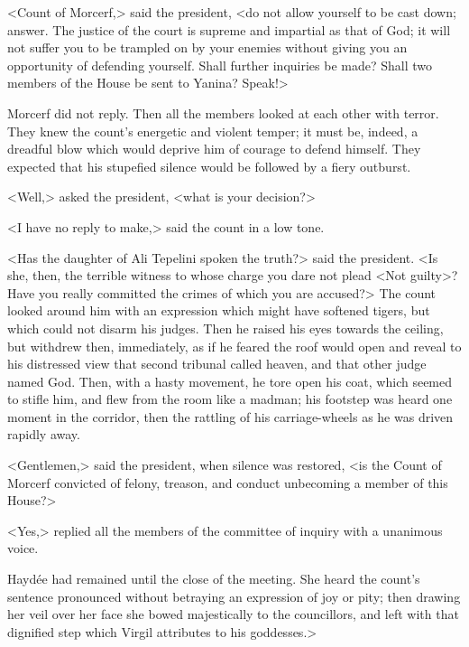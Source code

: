 <Count of Morcerf,> said the president, <do not allow yourself to be cast down; answer. The justice of the court is supreme and impartial as that of God; it will not suffer you to be trampled on by your enemies without giving you an opportunity of defending yourself. Shall further inquiries be made? Shall two members of the House be sent to Yanina? Speak!>

Morcerf did not reply. Then all the members looked at each other with terror. They knew the count's energetic and violent temper; it must be, indeed, a dreadful blow which would deprive him of courage to defend himself. They expected that his stupefied silence would be followed by a fiery outburst. 

<Well,> asked the president, <what is your decision?>  

<I have no reply to make,> said the count in a low tone. 

<Has the daughter of Ali Tepelini spoken the truth?> said the president. <Is she, then, the terrible witness to whose charge you dare not plead <Not guilty>? Have you really committed the crimes of which you are accused?> The count looked around him with an expression which might have softened tigers, but which could not disarm his judges. Then he raised his eyes towards the ceiling, but withdrew then, immediately, as if he feared the roof would open and reveal to his distressed view that second tribunal called heaven, and that other judge named God. Then, with a hasty movement, he tore open his coat, which seemed to stifle him, and flew from the room like a madman; his footstep was heard one moment in the corridor, then the rattling of his carriage-wheels as he was driven rapidly away. 

<Gentlemen,> said the president, when silence was restored, <is the Count of Morcerf convicted of felony, treason, and conduct unbecoming a member of this House?>

<Yes,> replied all the members of the committee of inquiry with a unanimous voice. 

 Haydée had remained until the close of the meeting. She heard the count's sentence pronounced without betraying an expression of joy or pity; then drawing her veil over her face she bowed majestically to the councillors, and left with that dignified step which Virgil attributes to his goddesses.> 